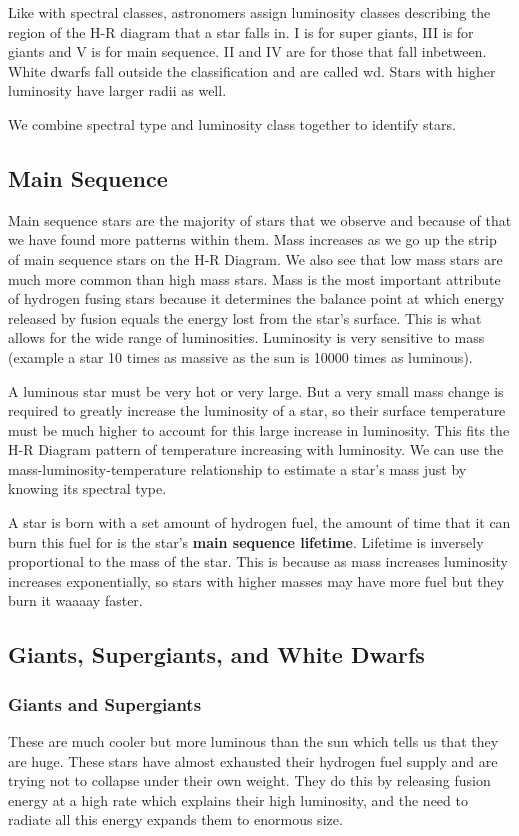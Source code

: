 Like with spectral classes, astronomers assign luminosity classes describing the region of the H-R diagram that a star falls in. I is for super giants, III is for giants and V is for main sequence. II and IV are for those that fall inbetween. White dwarfs fall outside the classification and are called wd. Stars with higher luminosity have larger radii as well.

We combine spectral type and luminosity class together to identify stars.

\subsection{Main Sequence}
Main sequence stars are the majority of stars that we observe and because of that we have found more patterns within them. Mass increases as we go up the strip of main sequence stars on the H-R Diagram. We also see that low mass stars are much more common than high mass stars. Mass is the most important attribute of hydrogen fusing stars because it determines the balance point at which energy released by fusion equals the energy lost from the star's surface. This is what allows for the wide range of luminosities. Luminosity is very sensitive to mass (example a star 10 times as massive as the sun is 10000 times as luminous).

A luminous star must be very hot or very large. But a very small mass change is required to greatly increase the luminosity of a star, so their surface temperature must be much higher to account for this large increase in luminosity. This fits the H-R Diagram pattern of temperature increasing with luminosity. We can use the mass-luminosity-temperature relationship to estimate a star's mass just by knowing its spectral type.

A star is born with a set amount of hydrogen fuel, the amount of time that it can burn this fuel for is the star's \textbf{main sequence lifetime}. Lifetime is inversely proportional to the mass of the star. This is because as mass increases luminosity increases exponentially, so stars with higher masses may have more fuel but they burn it waaaay faster.

\subsection{Giants, Supergiants, and White Dwarfs}
\subsubsection{Giants and Supergiants}
These are much cooler but more luminous than the sun which tells us that they are huge. These stars have almost exhausted their hydrogen fuel supply and are trying not to collapse under their own weight. They do this by releasing fusion energy at a high rate which explains their high luminosity, and the need to radiate all this energy expands them to enormous size.

